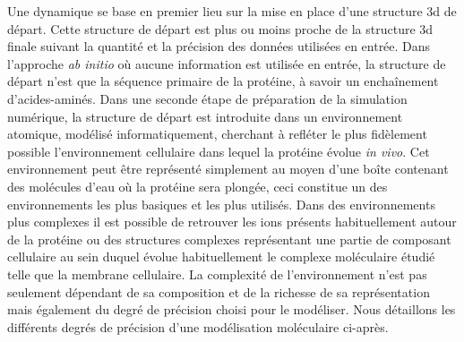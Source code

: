 Une dynamique se base en premier lieu sur la mise en place d'une structure 3d de départ. Cette structure de départ est plus ou moins proche de la structure 3d finale suivant la quantité et la précision des données utilisées en entrée. Dans l'approche \textit{ab initio} où aucune information est utilisée en entrée, la structure de départ n'est que la séquence primaire de la protéine, à savoir un enchaînement d'acides-aminés. 
Dans une seconde étape de préparation de la simulation numérique, la structure de départ est introduite dans un environnement atomique, modélisé informatiquement, cherchant à refléter le plus fidèlement possible l'environnement cellulaire dans lequel la protéine évolue \textit{in vivo}. Cet environnement peut être représenté simplement au moyen d'une boîte contenant des molécules d'eau où la protéine sera plongée, ceci constitue un des environnements les plus basiques et les plus utilisés. Dans des environnements plus complexes il est possible de retrouver les ions présents habituellement autour de la protéine ou des structures complexes représentant une partie de composant cellulaire au sein duquel évolue habituellement le complexe moléculaire étudié telle que la membrane cellulaire. 
La complexité de l'environnement n'est pas seulement dépendant de sa composition et de la richesse de sa représentation mais également du degré de précision choisi pour le modéliser. Nous détaillons les différents degrés de précision d'une modélisation moléculaire ci-après.

